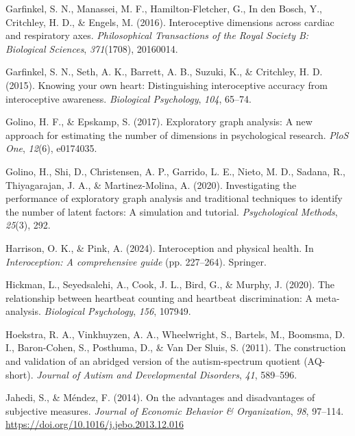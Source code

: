 \documentclass[
  jou,
  floatsintext,
  longtable,
  nolmodern,
  notxfonts,
  notimes,
  colorlinks=true,linkcolor=blue,citecolor=blue,urlcolor=blue]{apa7}
\newlength{\cslhangindent}
\newenvironment{CSLReferences}[2] %
 {\begin{list}{}{%
  \setlength{\itemindent}{0pt}
  \setlength{\leftmargin}{0pt}
  \setlength{\parsep}{0pt}
  \ifodd #1
   \setlength{\leftmargin}{\cslhangindent}
   \setlength{\itemindent}{-1\cslhangindent}
  \fi
  \setlength{\itemsep}{#2\baselineskip}}}
 {\end{list}}
\begin{document}
\begin{CSLReferences}{1}{0}
Garfinkel, S. N., Manassei, M. F., Hamilton-Fletcher, G., In den Bosch,
Y., Critchley, H. D., \& Engels, M. (2016). Interoceptive dimensions
across cardiac and respiratory axes. \emph{Philosophical Transactions of
the Royal Society B: Biological Sciences}, \emph{371}(1708), 20160014.

Garfinkel, S. N., Seth, A. K., Barrett, A. B., Suzuki, K., \& Critchley,
H. D. (2015). Knowing your own heart: Distinguishing interoceptive
accuracy from interoceptive awareness. \emph{Biological Psychology},
\emph{104}, 65--74.

Golino, H. F., \& Epskamp, S. (2017). Exploratory graph analysis: A new
approach for estimating the number of dimensions in psychological
research. \emph{PloS One}, \emph{12}(6), e0174035.

Golino, H., Shi, D., Christensen, A. P., Garrido, L. E., Nieto, M. D.,
Sadana, R., Thiyagarajan, J. A., \& Martinez-Molina, A. (2020).
Investigating the performance of exploratory graph analysis and
traditional techniques to identify the number of latent factors: A
simulation and tutorial. \emph{Psychological Methods}, \emph{25}(3),
292.

Harrison, O. K., \& Pink, A. (2024). Interoception and physical health.
In \emph{Interoception: A comprehensive guide} (pp. 227--264). Springer.

Hickman, L., Seyedsalehi, A., Cook, J. L., Bird, G., \& Murphy, J.
(2020). The relationship between heartbeat counting and heartbeat
discrimination: A meta-analysis. \emph{Biological Psychology},
\emph{156}, 107949.

Hoekstra, R. A., Vinkhuyzen, A. A., Wheelwright, S., Bartels, M.,
Boomsma, D. I., Baron-Cohen, S., Posthuma, D., \& Van Der Sluis, S.
(2011). The construction and validation of an abridged version of the
autism-spectrum quotient (AQ-short). \emph{Journal of Autism and
Developmental Disorders}, \emph{41}, 589--596.

Jahedi, S., \& Méndez, F. (2014). On the advantages and disadvantages of
subjective measures. \emph{Journal of Economic Behavior \&
Organization}, \emph{98}, 97--114.
\url{https://doi.org/10.1016/j.jebo.2013.12.016}


\end{CSLReferences}
\end{document}

